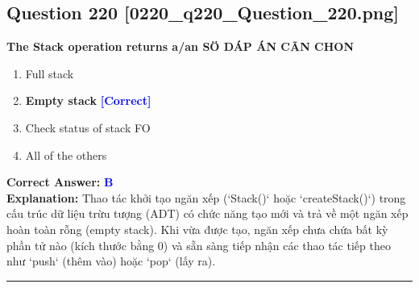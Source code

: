 \documentclass[11pt,a4paper]{article}
\begin{document}
\begin{minipage}{\textwidth}
\subsection*{Question 220 \quad \footnotesize{[0220\_q220\_Question\_220.png]}}
\noindent \textbf{The Stack operation returns a/an SÖ DÁP ÁN CÃN CHON}

\begin{enumerate}[label=\Alph*.]
    \item Full stack
    \item \textbf{Empty stack} \hfill \textcolor{blue}{\textbf{[Correct]}}
    \item Check status of stack FO
    \item All of the others
\end{enumerate}

\noindent \textbf{Correct Answer:} \textcolor{blue}{\textbf{B}} \\[2pt]
\noindent \textbf{Explanation:} Thao tác khởi tạo ngăn xếp (`Stack()` hoặc `createStack()`) trong cấu trúc dữ liệu trừu tượng (ADT) có chức năng tạo mới và trả về một ngăn xếp hoàn toàn rỗng (empty stack). Khi vừa được tạo, ngăn xếp chưa chứa bất kỳ phần tử nào (kích thước bằng 0) và sẵn sàng tiếp nhận các thao tác tiếp theo như `push` (thêm vào) hoặc `pop` (lấy ra).

\par\vspace{0.3cm}
\hrule
\vspace{0.3cm}
\end{minipage}
\end{document}
